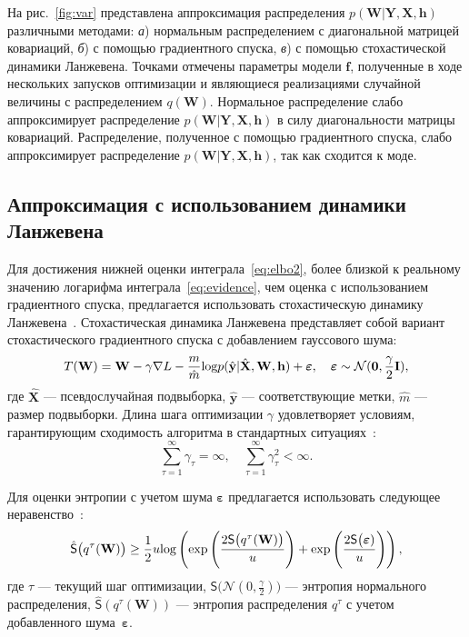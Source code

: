 На рис.~\ref{fig:var} представлена  {аппроксимация распределения $p(\mathbf{W}|\mathbf{Y}, \mathbf{X},\mathbf{h})$ различными методами: \textit{а}) нормальным распределением с диагональной матрицей ковариаций, \textit{б}) с помощью градиентного спуска, \textit{в}) с помощью стохастической динамики Ланжевена. Точками отмечены параметры модели $\mathbf{f}$, полученные в ходе нескольких запусков оптимизации и являющиеся реализациями случайной величины с распределением $q(\mathbf{W})$. Нормальное распределение слабо аппроксимирует распределение $p(\mathbf{W}|\mathbf{Y}, \mathbf{X},\mathbf{h})$ в силу диагональности матрицы ковариаций. Распределение, полученное с помощью градиентного спуска, слабо аппроксимирует распределение $p(\mathbf{W}|\mathbf{Y}, \mathbf{X},\mathbf{h})$, так как сходится к моде.}





\subsection{Аппроксимация с использованием динамики Ланжевена}
Для достижения нижней оценки интеграла~\eqref{eq:elbo2}, более близкой к реальному значению логарифма интеграла~\eqref{eq:evidence}, чем оценка с использованием градиентного спуска, предлагается использовать стохастическую динамику Ланжевена~\cite{langevin}. Стохастическая динамика Ланжевена представляет собой вариант стохастического градиентного спуска с добавлением гауссового шума:
\begin{equation}
\label{eq:langevin}
	T(\mathbf{W}) = \mathbf{W} -  \gamma \nabla L -\frac{m}{\hat{m}}\textnormal{log}p(\hat{\mathbf{y}}|\hat{\mathbf{X}}, \mathbf{W},\mathbf{h}) + \boldsymbol{\varepsilon}, \quad  \boldsymbol{\varepsilon} \sim \mathcal{N}(\mathbf{0}, {\frac{\gamma}{2}}\mathbf{I}),
\end{equation}
где $\hat{\mathbf{X}}$ --- псевдослучайная подвыборка, $\hat{\mathbf{y}}$ --- соответствующие метки, $\hat{m}$ --- размер подвыборки. Длина шага оптимизации $\gamma$ удовлетворяет  {условиям, гарантирующим сходимость алгоритма в стандартных ситуациях~\cite{langevin}}:
\[
	\sum_{\tau=1}^\infty \gamma_\tau = \infty, \quad \sum_{\tau=1}^\infty \gamma_\tau^2 < \infty.
\]

Для оценки энтропии с учетом шума $\boldsymbol{\varepsilon}$ предлагается использовать следующее неравенство~\cite{entropy,var_grad}:
\[
\hat{\mathsf{S}}\bigl(q^\tau(\mathbf{W})\bigr)   \geq \frac{1}{2}u\textnormal{log}\left(\textnormal{exp}\left(\frac{2\mathsf{S}\bigl(q^\tau(\mathbf{W})\bigr)}{u}\right) + \textnormal{exp}\left(\frac{2\mathsf{S}\bigl( \boldsymbol{\varepsilon})}{u}\right)\right),
\]
{где  $\tau$ --- текущий шаг оптимизации,} $\mathsf{S}\bigl( \mathcal{N}({0}, {\frac{\gamma}{2}})\bigr)$ --- энтропия нормального распределения, $\hat{\mathsf{S}}(q^\tau(\mathbf{W}))$ --- энтропия распределения $q^\tau$ с учетом добавленного шума~$\boldsymbol{\varepsilon}$.


